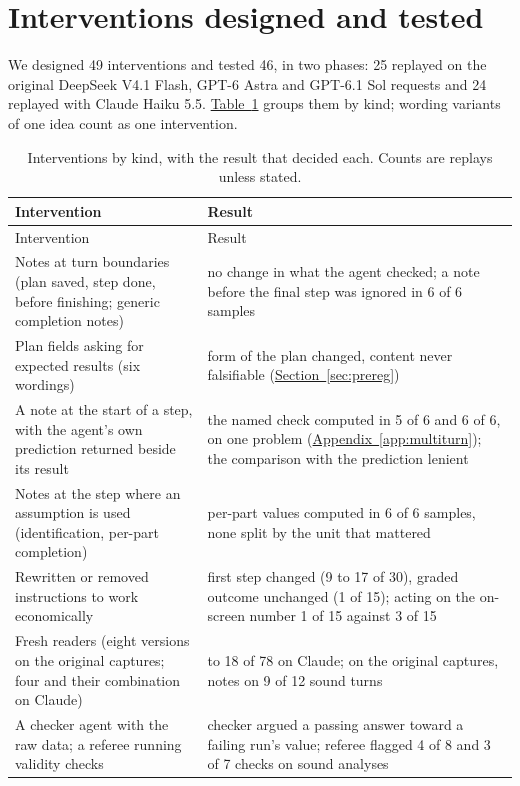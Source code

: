 \documentclass[10pt]{article}
\newcommand{\tabref}[1]{\hyperref[#1]{Table~\ref*{#1}}}
\newcommand{\sref}[1]{\hyperref[#1]{Section~\ref*{#1}}}
\newcommand{\aref}[1]{\hyperref[#1]{Appendix~\ref*{#1}}}
\begin{document}
\section{Interventions designed and tested}\label{app:history}
We designed 49 interventions and tested 46, in two phases: 25 replayed on the original DeepSeek V4.1 Flash, GPT-6 Astra and GPT-6.1 Sol requests
and 24 replayed with Claude Haiku 5.5. \tabref{tab:history} groups them by kind; wording variants of one idea
count as one intervention.
\begin{small}
\begin{longtable}{@{}>{\raggedright\arraybackslash}p{5.2cm}>{\raggedright\arraybackslash}p{10.6cm}@{}}
\caption{Interventions by kind, with the result that decided each. Counts are replays unless stated.}\label{tab:history}\\
\toprule
Intervention & Result\\
\midrule\endfirsthead
\toprule
Intervention & Result\\
\midrule\endhead
Notes at turn boundaries (plan saved, step done, before finishing; generic completion notes) & no change in what the agent checked; a note before the final step was ignored in 6 of 6 samples\\
Plan fields asking for expected results (six wordings) & form of the plan changed, content never falsifiable (\sref{sec:prereg})\\
A note at the start of a step, with the agent's own prediction returned beside its result & the named check computed in 5 of 6 and 6 of 6, on one problem (\aref{app:multiturn}); the comparison with the prediction lenient\\
Notes at the step where an assumption is used (identification, per-part completion) & per-part values computed in 6 of 6 samples, none split by the unit that mattered\\
Rewritten or removed instructions to work economically & first step changed (9 to 17 of 30), graded outcome unchanged (1 of 15); acting on the on-screen number 1 of 15 against 3 of 15\\
Fresh readers (eight versions on the original captures; four and their combination on Claude) & 10 to 18 of 78 on Claude; on the original captures, notes on 9 of 12 sound turns\\
A checker agent with the raw data; a referee running validity checks & checker argued a passing answer toward a failing run's value; referee flagged 4 of 8 and 3 of 7 checks on sound analyses\\

\end{longtable}
\end{small}
\end{document}
